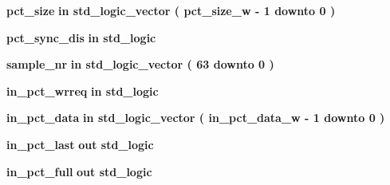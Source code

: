 \begin{DoxyCompactItemize}
\item 
{\bf pct\+\_\+size}  {\bfseries {\bfseries \textcolor{keywordflow}{in}\textcolor{vhdlchar}{ }}} {\bfseries \textcolor{comment}{std\+\_\+logic\+\_\+vector}\textcolor{vhdlchar}{ }\textcolor{vhdlchar}{(}\textcolor{vhdlchar}{ }\textcolor{vhdlchar}{ }\textcolor{vhdlchar}{ }\textcolor{vhdlchar}{ }{\bfseries {\bf pct\+\_\+size\+\_\+w}} \textcolor{vhdlchar}{-\/}\textcolor{vhdlchar}{ } \textcolor{vhdldigit}{1} \textcolor{vhdlchar}{ }\textcolor{keywordflow}{downto}\textcolor{vhdlchar}{ }\textcolor{vhdlchar}{ } \textcolor{vhdldigit}{0} \textcolor{vhdlchar}{ }\textcolor{vhdlchar}{)}\textcolor{vhdlchar}{ }} 
\item 
{\bf pct\+\_\+sync\+\_\+dis}  {\bfseries {\bfseries \textcolor{keywordflow}{in}\textcolor{vhdlchar}{ }}} {\bfseries \textcolor{comment}{std\+\_\+logic}\textcolor{vhdlchar}{ }} 
\item 
{\bf sample\+\_\+nr}  {\bfseries {\bfseries \textcolor{keywordflow}{in}\textcolor{vhdlchar}{ }}} {\bfseries \textcolor{comment}{std\+\_\+logic\+\_\+vector}\textcolor{vhdlchar}{ }\textcolor{vhdlchar}{(}\textcolor{vhdlchar}{ }\textcolor{vhdlchar}{ } \textcolor{vhdldigit}{63} \textcolor{vhdlchar}{ }\textcolor{keywordflow}{downto}\textcolor{vhdlchar}{ }\textcolor{vhdlchar}{ } \textcolor{vhdldigit}{0} \textcolor{vhdlchar}{ }\textcolor{vhdlchar}{)}\textcolor{vhdlchar}{ }} 
\item 
{\bf in\+\_\+pct\+\_\+wrreq}  {\bfseries {\bfseries \textcolor{keywordflow}{in}\textcolor{vhdlchar}{ }}} {\bfseries \textcolor{comment}{std\+\_\+logic}\textcolor{vhdlchar}{ }} 
\item 
{\bf in\+\_\+pct\+\_\+data}  {\bfseries {\bfseries \textcolor{keywordflow}{in}\textcolor{vhdlchar}{ }}} {\bfseries \textcolor{comment}{std\+\_\+logic\+\_\+vector}\textcolor{vhdlchar}{ }\textcolor{vhdlchar}{(}\textcolor{vhdlchar}{ }\textcolor{vhdlchar}{ }\textcolor{vhdlchar}{ }\textcolor{vhdlchar}{ }{\bfseries {\bf in\+\_\+pct\+\_\+data\+\_\+w}} \textcolor{vhdlchar}{-\/}\textcolor{vhdlchar}{ } \textcolor{vhdldigit}{1} \textcolor{vhdlchar}{ }\textcolor{keywordflow}{downto}\textcolor{vhdlchar}{ }\textcolor{vhdlchar}{ } \textcolor{vhdldigit}{0} \textcolor{vhdlchar}{ }\textcolor{vhdlchar}{)}\textcolor{vhdlchar}{ }} 
\item 
{\bf in\+\_\+pct\+\_\+last}  {\bfseries {\bfseries \textcolor{keywordflow}{out}\textcolor{vhdlchar}{ }}} {\bfseries \textcolor{comment}{std\+\_\+logic}\textcolor{vhdlchar}{ }} 
\item 
{\bf in\+\_\+pct\+\_\+full}  {\bfseries {\bfseries \textcolor{keywordflow}{out}\textcolor{vhdlchar}{ }}} {\bfseries \textcolor{comment}{std\+\_\+logic}\textcolor{vhdlchar}{ }} 

\end{DoxyCompactItemize}

